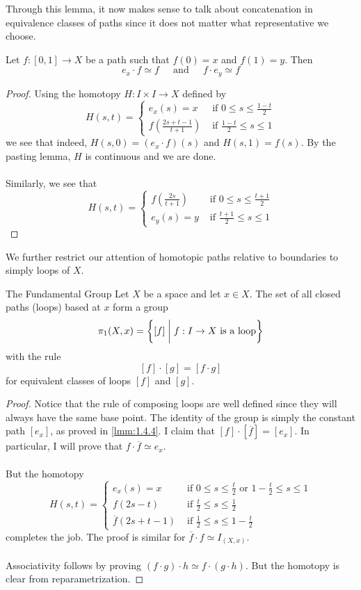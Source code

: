 \documentclass[a4paper]{article}
\begin{document}
Through this lemma, it now makes sense to talk about concatenation in equivalence classes of paths since it does not matter what representative we choose. 

\begin{prp}{}{} Let $f:[0,1]\to X$ be a path such that $f(0)=x$ and $f(1)=y$. Then $$e_x\cdot f\simeq f\;\;\;\;\text{ and }\;\;\;\;f\cdot e_y\simeq f$$ \tcbline
\begin{proof}
Using the homotopy $H:I\times I\to X$ defined by $$H(s,t)=\begin{cases}
e_x(s)=x & \text{ if } 0\leq s\leq\frac{1-t}{2}\\
f\left(\frac{2s+t-1}{t+1}\right) & \text{ if }\frac{1-t}{2}\leq s\leq 1
\end{cases}$$ we see that indeed, $H(s,0)=(e_x\cdot f)(s)$ and $H(s,1)=f(s)$. By the pasting lemma, $H$ is continuous and we are done. \\~\\
Similarly, we see that $$H(s,t)=\begin{cases}
f\left(\frac{2s}{t+1}\right) & \text{ if } 0\leq s\leq\frac{t+1}{2}\\
e_y(s)=y & \text{ if } \frac{t+1}{2}\leq s\leq 1
\end{cases}$$
\end{proof}
\end{prp}

We further restrict our attention of homotopic paths relative to boundaries to simply loops of $X$. 

\begin{thm}{The Fundamental Group}{} Let $X$ be a space and let $x\in X$. The set of all closed paths (loops) based at $x$ form a group $$\pi_1(X,x)=\left\{[f]\;\bigg{|}\;f:I\to X\text{ is a loop}\right\}$$ with the rule $$[f]\cdot[g]=[f\cdot g]$$ for equivalent classes of loops $[f]$ and $[g]$. \tcbline
\begin{proof}
Notice that the rule of composing loops are well defined since they will always have the same base point. The identity of the group is simply the constant path $[e_x]$, as proved in \ref{lmm:1.4.4}. I claim that $[f]\cdot[\overline{f}]=[e_x]$. In particular, I will prove that $f\cdot\overline{f}\simeq e_x$. \\~\\
But the homotopy $$H(s,t)=\begin{cases}
e_x(s)=x & \text{ if }0\leq s\leq\frac{t}{2}\text{ or }1-\frac{t}{2}\leq s\leq 1\\
f(2s-t) & \text{ if } \frac{t}{2}\leq s\leq\frac{1}{2}\\
\overline{f}(2s+t-1) & \text{ if }\frac{1}{2}\leq s\leq 1-\frac{t}{2}
\end{cases}$$
completes the job. The proof is similar for $\overline{f}\cdot f\simeq I_{(X,x)}$. \\~\\
Associativity follows by proving $(f\cdot g)\cdot h\simeq f\cdot(g\cdot h)$. But the homotopy is clear from reparametrization. 
\end{proof}
\end{thm}
\end{document}
